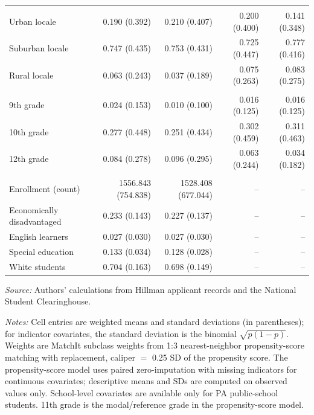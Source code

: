 \begin{table}[!h]
\begin{threeparttable}
\begin{tabular}[t]{lrrrr}
\addlinespace[3pt]
\addlinespace[0.3em]
\multicolumn{5}{l}{School locale}\\
\hspace{1em}Urban locale & 0.190 (0.392) & 0.210 (0.407) & 0.200 (0.400) & 0.141 (0.348)\\
\hspace{1em}Suburban locale & 0.747 (0.435) & 0.753 (0.431) & 0.725 (0.447) & 0.777 (0.416)\\
\hspace{1em}Rural locale & 0.063 (0.243) & 0.037 (0.189) & 0.075 (0.263) & 0.083 (0.275)\\
\addlinespace[3pt]
\addlinespace[0.3em]
\multicolumn{5}{l}{Grade in program}\\
\hspace{1em}9th grade & 0.024 (0.153) & 0.010 (0.100) & 0.016 (0.125) & 0.016 (0.125)\\
\hspace{1em}10th grade & 0.277 (0.448) & 0.251 (0.434) & 0.302 (0.459) & 0.311 (0.463)\\
\hspace{1em}12th grade & 0.084 (0.278) & 0.096 (0.295) & 0.063 (0.244) & 0.034 (0.182)\\
\addlinespace[3pt]
\addlinespace[0.3em]
\multicolumn{5}{l}{School characteristics (PA only)}\\
\hspace{1em}Enrollment (count) & 1556.843 (754.838) & 1528.408 (677.044) & -- & --\\
\hspace{1em}Economically disadvantaged & 0.233 (0.143) & 0.227 (0.137) & -- & --\\
\hspace{1em}English learners & 0.027 (0.030) & 0.027 (0.030) & -- & --\\
\hspace{1em}Special education & 0.133 (0.034) & 0.128 (0.028) & -- & --\\
\hspace{1em}White students & 0.704 (0.163) & 0.698 (0.149) & -- & --\\
\bottomrule
\end{tabular}
\begin{tablenotes}
\item \textit{Source:} Authors' calculations from Hillman applicant records and the National Student Clearinghouse.
\item \textit{Notes:} Cell entries are weighted means and standard deviations (in parentheses); for indicator covariates, the standard deviation is the binomial $\sqrt{p(1-p)}$. Weights are MatchIt subclass weights from 1:3 nearest-neighbor propensity-score matching with replacement, caliper $=$ 0.25 SD of the propensity score. The propensity-score model uses paired zero-imputation with missing indicators for continuous covariates; descriptive means and SDs are computed on observed values only. School-level covariates are available only for PA public-school students. 11th grade is the modal/reference grade in the propensity-score model.
\end{tablenotes}
\end{threeparttable}
\end{table}
